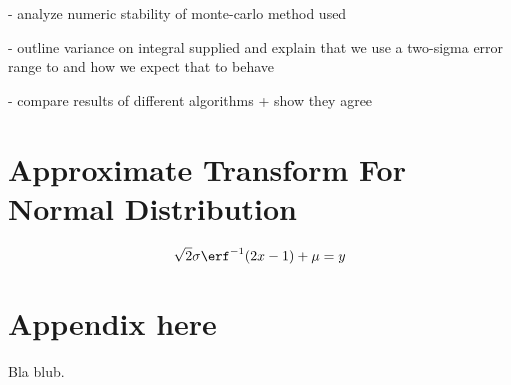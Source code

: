 \documentclass[10pt, a4paper]{article}
\begin{document}
- analyze numeric stability of monte-carlo method used

- outline variance on integral supplied and explain that we use a two-sigma error range to
  and how we expect that to behave

- compare results of different algorithms + show they agree

\section{Approximate Transform For Normal Distribution}
\begin{equation}
\sqrt{2} \sigma \erf^{-1}(2x - 1) + \mu = y
\end{equation}

{}


\appendix{}

\section{Appendix here}
Bla blub.
\end{document}
